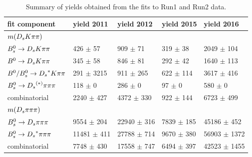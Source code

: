 \begin{table}[h]
\centering
 \begin{tabular}{l || l l l l}
fit component & yield 2011 & yield 2012 & yield 2015 & yield 2016\ \\
\hline\hline
$m({{D}_{s}}{K}{\pi}{\pi})$ &  &  &  &  \\
\hline
${{B}^0_{s}}\rightarrow{\ensuremath{{D}_{s}}}{\ensuremath{K}}{\ensuremath{\pi}}{\ensuremath{\pi}}$ & 426 $\pm$ 57 & 909 $\pm$ 71 & 319 $\pm$ 38 & 2049 $\pm$ 104 \\
${{B}^0}\rightarrow{\ensuremath{{D}_{s}}}{\ensuremath{K}}{\ensuremath{\pi}}{\ensuremath{\pi}}$ & 345 $\pm$ 58 & 846 $\pm$ 81 & 292 $\pm$ 42 & 1640 $\pm$ 113 \\
${{B}^0}/{{B}^0_{s}}\rightarrow{\ensuremath{{D}_{s}}}^{*}{K}{\pi}{\pi}$ & 291 $\pm$ 3215 & 911 $\pm$ 265 & 622 $\pm$ 114 & 3617 $\pm$ 416 \\
${{B}^0_{s}}\rightarrow{\ensuremath{{D}_{s}}}^{(*)}{\pi}{\pi}{\pi}$ & 118 $\pm$ 0 & 286 $\pm$ 0 & 97 $\pm$ 0 & 580 $\pm$ 0 \\
combinatorial & 2240 $\pm$ 427 & 4372 $\pm$ 330 & 922 $\pm$ 144 & 6723 $\pm$ 499 \\
\hline\hline
$m({{D}_{s}}{\pi}{\pi}{\pi})$ &  &  &  &  \\
${{B}^0_{s}}\rightarrow{\ensuremath{{D}_{s}}}{\ensuremath{\pi}}{\ensuremath{\pi}}{\ensuremath{\pi}}$ & 9554 $\pm$ 204 & 22940 $\pm$ 316 & 7839 $\pm$ 185 & 45186 $\pm$ 452 \\
${{B}^0_{s}}\rightarrow{\ensuremath{{D}_{s}}}^{*}{\pi}{\pi}{\pi}$ & 11481 $\pm$ 411 & 27788 $\pm$ 714 & 9670 $\pm$ 380 & 56903 $\pm$ 1372 \\
combinatorial & 7748 $\pm$ 430 & 17558 $\pm$ 747 & 6494 $\pm$ 397 & 42523 $\pm$ 1455 \\
\hline
\end{tabular}
\caption{Summary of yields obtained from the fits to Run1 and Run2 data.}
\label{table:YieldsFromMassfit}
\end{table}


